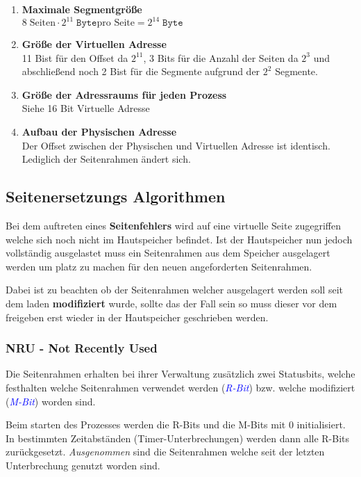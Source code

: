 \documentclass[10pt,a4paper]{article}
\begin{document}
\begin{multicols*}{4}
\begin{enumerate}
	\item\textbf{Maximale Segmentgröße}\hfill\\
	      \(8\;\text{Seiten} \cdot 2^{11}\;\texttt{Byte}\text{pro Seite} = 2^{14}\;\texttt{Byte}\)
	\item\textbf{Größe der Virtuellen Adresse}\hfill\\
	      11 Bist für den Offset da \(2^{11}\), 3 Bits für die Anzahl der Seiten da \(2^{3}\) und abschließend noch
	      2 Bist für die Segmente aufgrund der \(2^{2}\) Segmente.
	\item\textbf{Größe der Adressraums für jeden Prozess}\hfill\\
	      Siehe 16 Bit Virtuelle Adresse
	\item\textbf{Aufbau der Physischen Adresse}\hfill\\
	      Der Offset zwischen der Physischen und Virtuellen Adresse ist identisch. Lediglich der Seitenrahmen ändert
	      sich.
\end{enumerate}

\subsection{Seitenersetzungs Algorithmen}
Bei dem auftreten eines \textbf{Seitenfehlers} wird auf eine virtuelle Seite zugegriffen welche sich noch nicht im
Hautspeicher befindet. Ist der Hautspeicher nun jedoch vollständig ausgelastet muss ein Seitenrahmen aus dem Speicher
ausgelagert werden um platz zu machen für den neuen angeforderten Seitenrahmen.

Dabei ist zu beachten ob der Seitenrahmen welcher ausgelagert werden soll seit dem laden \textbf{modifiziert} wurde,
sollte das der Fall sein so muss dieser vor dem freigeben erst wieder in der Hautspeicher geschrieben werden.

\subsubsection*{NRU - Not Recently Used}
Die Seitenrahmen erhalten bei ihrer Verwaltung zusätzlich zwei Statusbits, welche festhalten welche Seitenrahmen
verwendet werden (\textcolor{blue}{\it R-Bit}) bzw. welche modifiziert (\textcolor{blue}{\it M-Bit})
worden sind.

Beim starten des Prozesses werden die R-Bits und die M-Bits mit \(0\) initialisiert. In bestimmten Zeitabständen
(Timer-Unterbrechungen) werden dann alle R-Bits zurückgesetzt. \textit{Ausgenommen} sind die Seitenrahmen welche seit
der letzten Unterbrechung genutzt worden sind.


\end{multicols*}
\end{document}
